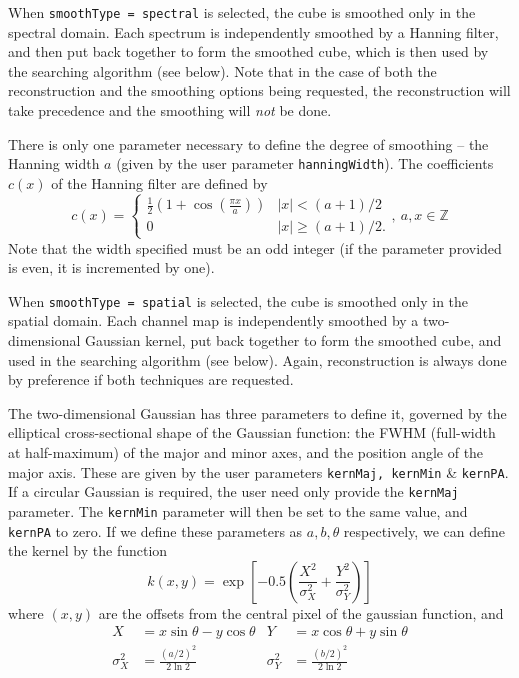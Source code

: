 
When \texttt{smoothType = spectral} is selected, the cube is smoothed
only in the spectral domain. Each spectrum is independently smoothed
by a Hanning filter, and then put back together to form the smoothed
cube, which is then used by the searching algorithm (see below). Note
that in the case of both the reconstruction and the smoothing options
being requested, the reconstruction will take precedence and the
smoothing will \emph{not} be done.

There is only one parameter necessary to define the degree of
smoothing -- the Hanning width $a$ (given by the user parameter
\texttt{hanningWidth}). The coefficients $c(x)$ of the Hanning filter
are defined by
\[
c(x) = 
  \begin{cases}
   \frac{1}{2}\left(1+\cos(\frac{\pi x}{a})\right) &|x| < (a+1)/2\\
   0                                               &|x| \geq (a+1)/2.
  \end{cases},\ a,x \in \mathbb{Z}
\]
Note that the width specified must be an
odd integer (if the parameter provided is even, it is incremented by
one).


When \texttt{smoothType = spatial} is selected, the cube is smoothed
only in the spatial domain. Each channel map is independently smoothed
by a two-dimensional Gaussian kernel, put back together to form the
smoothed cube, and used in the searching algorithm (see below). Again,
reconstruction is always done by preference if both techniques are
requested.

The two-dimensional Gaussian has three parameters to define it,
governed by the elliptical cross-sectional shape of the Gaussian
function: the FWHM (full-width at half-maximum) of the major and minor
axes, and the position angle of the major axis. These are given by the
user parameters \texttt{kernMaj, kernMin} \& \texttt{kernPA}. If a
circular Gaussian is required, the user need only provide the
\texttt{kernMaj} parameter. The \texttt{kernMin} parameter will then
be set to the same value, and \texttt{kernPA} to zero.  If we define
these parameters as $a,b,\theta$ respectively, we can define the
kernel by the function
\[ 
k(x,y) = \exp\left[-0.5 \left(\frac{X^2}{\sigma_X^2} + 
                              \frac{Y^2}{\sigma_Y^2}   \right) \right] 
\]
where $(x,y)$ are the offsets from the central pixel of the gaussian
function, and 
\begin{align*}
X& = x\sin\theta - y\cos\theta&
  Y&= x\cos\theta + y\sin\theta\\
\sigma_X^2& = \frac{(a/2)^2}{2\ln2}&
  \sigma_Y^2& = \frac{(b/2)^2}{2\ln2}\\
\end{align*}

